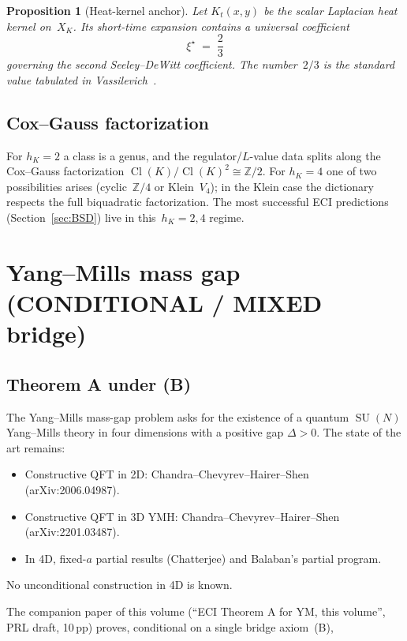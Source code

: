 \documentclass[11pt,a4paper]{article}
\newtheorem{proposition}[theorem]{Proposition}
\theoremstyle{definition}
\DeclareMathOperator{\SU}{SU}
\DeclareMathOperator{\Cl}{Cl}
\newcommand{\ZZ}{\mathbb{Z}}
\begin{document}
\begin{proposition}[Heat-kernel anchor]
\label{prop:vassilevich}
Let $K_{t}(x,y)$ be the scalar Laplacian heat kernel on~$X_{K}$. Its
short-time expansion contains a universal coefficient
\begin{equation}
\xi^{\star} \;=\; \frac{2}{3}
\label{eq:vassilevich}
\end{equation}
governing the second Seeley--DeWitt coefficient. The number~$2/3$ is the
standard value tabulated in Vassilevich~\cite{Vassilevich2003}.
\end{proposition}

\subsection{Cox--Gauss factorization}
For $h_{K} = 2$ a class is a genus, and the regulator/$L$-value data
splits along the Cox--Gauss factorization $\Cl(K)/\Cl(K)^{2}\cong\ZZ/2$.
For $h_{K} = 4$ one of two possibilities arises (cyclic~$\ZZ/4$ or
Klein~$V_{4}$); in the Klein case the dictionary respects the full
biquadratic factorization. The most successful ECI predictions
(Section~\ref{sec:BSD}) live in this~$h_{K}=2,4$ regime.

\section{Yang--Mills mass gap (CONDITIONAL / MIXED bridge)}
\label{sec:YM}

\subsection{Theorem A under (B)}
The Yang--Mills mass-gap problem asks for the existence of a quantum
$\SU(N)$ Yang--Mills theory in four dimensions with a positive gap
$\Delta>0$. The state of the art remains:
\begin{itemize}
  \item Constructive QFT in 2D: Chandra--Chevyrev--Hairer--Shen~\cite{CCHS2D} (arXiv:2006.04987).
  \item Constructive QFT in 3D YMH: Chandra--Chevyrev--Hairer--Shen~\cite{CCHS3D} (arXiv:2201.03487).
  \item In 4D, fixed-$a$ partial results (Chatterjee) and Balaban's
        partial program.
\end{itemize}
No unconditional construction in 4D is known.

The companion paper of this volume (``ECI Theorem A for YM, this volume'',
PRL draft, 10\,pp) proves, conditional on a single bridge axiom~(B),
\end{document}
